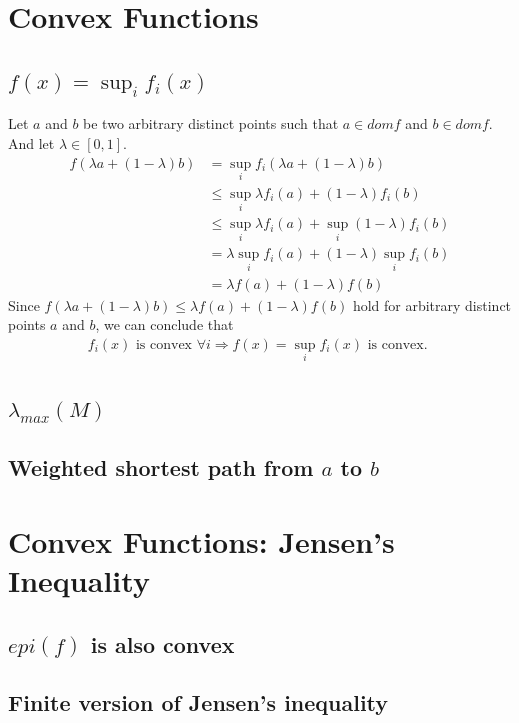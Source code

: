 \documentclass[11pt,a4paper]{article}
\begin{document}
\newpage
\section{Convex Functions}
\subsection{$f(x) = \sup_i f_i (x)$}
Let $a$ and $b$ be two arbitrary distinct points such that $a \in dom f$ and $b \in dom f$. And
let $\lambda \in [0, 1]$.
\begin{align}
    f(\lambda a + (1-\lambda) b) 
    &= \sup_i f_i (\lambda a + (1-\lambda) b) \\
    &\leq \sup_i \lambda f_i (a) + (1-\lambda) f_i (b) \\
    &\leq \sup_i \lambda f_i (a) + \sup_i (1-\lambda) f_i (b) \\
    &= \lambda \sup_i  f_i (a) + (1-\lambda) \sup_i f_i (b) \\
    &= \lambda f(a) + (1-\lambda) f(b)
\end{align}
Since $ f(\lambda a + (1-\lambda) b) \leq \lambda f(a) + (1-\lambda) f(b)$
hold for arbitrary distinct points $a$ and $b$, we
can conclude that 
\begin{align}
    f_i(x) \text{ is convex } \forall i \Rightarrow f(x) = \sup_i f_i(x) \text{ is convex. }
\end{align}

\subsection{$\lambda_{max} (M)$}

\subsection{Weighted shortest path from $a$ to $b$}


\newpage
\section{Convex Functions: Jensen's Inequality}
\subsection{$epi(f)$ is also convex}

\subsection{Finite version of Jensen's inequality}
\end{document}
